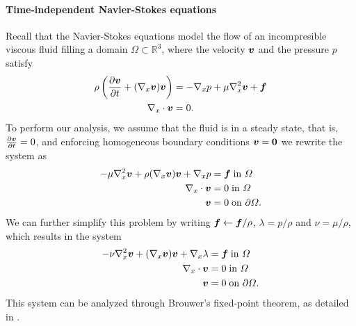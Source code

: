 \documentclass{article}
\renewcommand{\vec}{\vectorsym}
\newcommand{\R}{\mathbb{R}}
\newcommand{\vx}{\nabla_x}
\newcommand{\tin}{\text{in }}
\newcommand{\ton}{\text{on }}
\begin{document}
\paragraph{Time-independent Navier-Stokes equations} Recall that the Navier-Stokes equations model the flow of an incompresible viscous fluid filling a domain $\Omega\subset\R^3$, where the velocity $\vec v$ and the pressure $p$ satisfy
\begin{align*}
    \rho\left(\frac{\partial \vec v}{\partial t} + (\vx\vec v)\vec v\right) &= -\vx p + \mu\vx^2 \vec v + \vec f\\
    \vx\cdot\vec v &= 0.
\end{align*} 
To perform our analysis, we assume that the fluid is in a steady state, that is, $\frac{\partial \vec v}{\partial t} = 0$, and enforcing homogeneous boundary conditions $\vec v = \vec 0$ we rewrite the system as 
\begin{align*}
    -\mu\vx^2\vec v + \rho (\vx\vec v)\vec v + \vx p &= \vec f\;\tin \Omega\\
    \vx\cdot\vec v &= 0 \;\tin \Omega\\
    \vec v &= 0 \;\ton \partial\Omega.
\end{align*} 
We can further simplify this problem by writing $\vec f\leftarrow \vec f / \rho$, $\lambda = p/\rho$ and $\nu = \mu/\rho$, which results in the system
\begin{align*}
    -\nu \vx^2\vec v + (\vx\vec v)\vec v + \vx \lambda &= \vec f\;\tin \Omega\\
    \vx\cdot\vec v &= 0 \;\tin \Omega\\
    \vec v &= 0 \;\ton \partial\Omega.  
\end{align*}
This system can be analyzed through Brouwer's fixed-point theorem, as detailed in \cite{ciarlet2013linear}.
\end{document}
